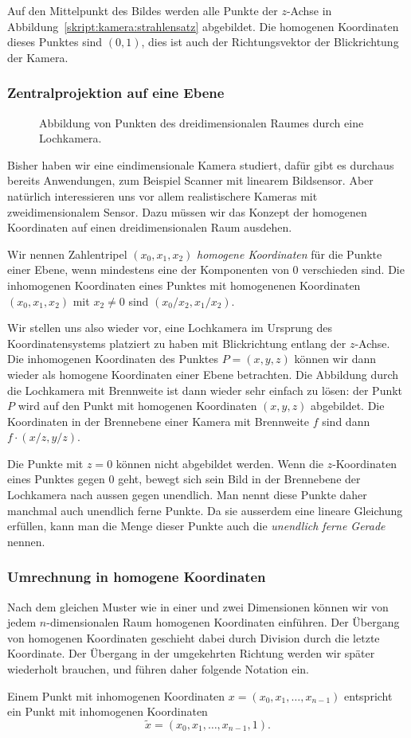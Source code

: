 Auf den Mittelpunkt des Bildes werden alle Punkte der $z$-Achse
in Abbildung~\ref{skript:kamera:strahlensatz} abgebildet.
Die homogenen Koordinaten dieses Punktes sind $(0,1)$, dies ist
auch der Richtungsvektor der Blickrichtung der Kamera.

\subsubsection{Zentralprojektion auf eine Ebene}
\begin{figure}
\centering
\caption{Abbildung von Punkten des dreidimensionalen Raumes durch eine
Lochkamera.
\label{skript:kamera:lochkamera}}
\end{figure}
Bisher haben wir eine eindimensionale Kamera studiert, dafür gibt
es durchaus bereits Anwendungen, zum Beispiel Scanner mit linearem
Bildsensor.
Aber natürlich
interessieren uns vor allem realistischere Kameras mit zweidimensionalem
Sensor.
Dazu müssen wir das Konzept der homogenen Koordinaten auf einen
dreidimensionalen Raum ausdehen.

\begin{definition}
Wir nennen Zahlentripel $(x_0,x_1,x_2)$ {\em homogene Koordinaten}
für die Punkte einer Ebene, wenn mindestens eine der Komponenten von $0$
verschieden sind.
Die inhomogenen Koordinaten eines Punktes mit homogenenen Koordinaten
$(x_0,x_1,x_2)$ mit $x_2\ne 0$ sind $(x_0/x_2,x_1/x_2)$.
\end{definition}

Wir stellen uns also wieder vor, eine Lochkamera im Ursprung des
Koordinatensystems platziert zu haben mit Blickrichtung entlang der
$z$-Achse.
Die inhomogenen Koordinaten des Punktes $P=(x,y,z)$ können wir dann
wieder als homogene Koordinaten einer Ebene betrachten.
Die Abbildung durch die Lochkamera mit Brennweite ist dann wieder sehr
einfach zu lösen: der Punkt $P$ wird auf den Punkt mit homogenen Koordinaten
$(x,y,z)$ abgebildet.
Die Koordinaten in der Brennebene einer Kamera mit Brennweite $f$ sind dann
$f\cdot (x/z, y/z)$.

Die Punkte mit $z=0$ können nicht abgebildet werden.
Wenn die $z$-Koordinaten eines Punktes gegen $0$ geht, bewegt sich sein
Bild in der Brennebene der Lochkamera nach aussen gegen unendlich.
Man nennt diese Punkte daher manchmal auch unendlich ferne Punkte.
Da sie ausserdem eine lineare Gleichung erfüllen, kann man die Menge dieser
Punkte auch die {\em unendlich ferne Gerade} nennen.
%

\subsubsection{Umrechnung in homogene Koordinaten}
Nach dem gleichen Muster wie in einer und zwei Dimensionen
können wir von jedem $n$-dimensionalen Raum homogenen Koordinaten einführen.
Der Übergang von homogenen Koordinaten geschieht dabei durch Division
durch die letzte Koordinate.
Der Übergang in der umgekehrten Richtung werden wir später wiederholt
brauchen, und führen daher folgende Notation ein.

\begin{definition}
Einem Punkt mit inhomogenen Koordinaten $x=(x_0,x_1,\dots,x_{n-1})$ entspricht
ein Punkt mit
inhomogenen Koordinaten
\[
\tilde x = (x_0,x_1,\dots,x_{n-1},1).
\]
\end{definition}

